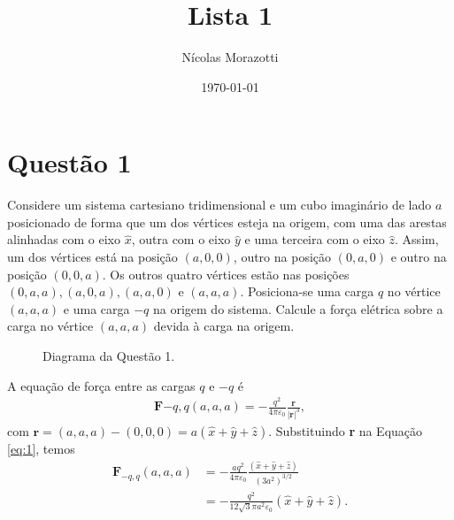 \documentclass[11pt]{article}
\author{Nícolas Morazotti}
\date{\today}
\title{Lista 1}
\begin{document}
\maketitle
\section{Questão 1}
\label{sec:org53b54c4}
Considere um sistema cartesiano tridimensional e um cubo imaginário de
lado \(a\) posicionado de forma que um dos vértices esteja na origem, com
uma das arestas alinhadas com o eixo \(\hat x\), outra com o eixo \(\hat y\)
e uma terceira com o eixo \(\hat z\). Assim, um dos vértices está na
posição \((a,0,0)\), outro na posição \((0,a,0)\) e outro na posição
\((0,0,a)\). Os outros quatro vértices estão nas posições
\((0,a,a), (a,0,a), (a,a,0)\) e \((a,a,a)\). Posiciona-se uma carga \(q\) no
vértice \((a,a,a)\) e uma carga \(-q\) na origem do sistema. Calcule a força
elétrica sobre a carga no vértice \((a,a,a)\) devida à carga na origem. 

\begin{figure}[h!]
  \centering
  \caption{Diagrama da Questão 1.}
  \label{fig:ex-1}
\end{figure}

A equação de força entre as cargas \(q\) e \(-q\) é
\begin{align}
  \label{eq:1}
  \mathbf{F}{-q,q}(a,a,a) = -\frac{q^2}{4\pi\varepsilon_0}\frac{\mathbf{r}}{|\mathbf{r}|^3},
\end{align}
com \(\mathbf r = (a,a,a) - (0,0,0) = a(\hat x+\hat y+\hat
z)\). Substituindo \textbf{r} na Equação \ref{eq:1}, temos
\begin{align*}
  \mathbf{F}_{-q,q}(a,a,a) &= -\frac{aq^2}{4\pi\varepsilon_0}
                             \frac{(\hat x+\hat y+\hat z)}{(3a^2)^{3/2}}\\
                           &= -\frac{q^2}{12\sqrt3\pi a^2\varepsilon_0}(\hat x+\hat y+\hat z).
\end{align*}
\end{document}
